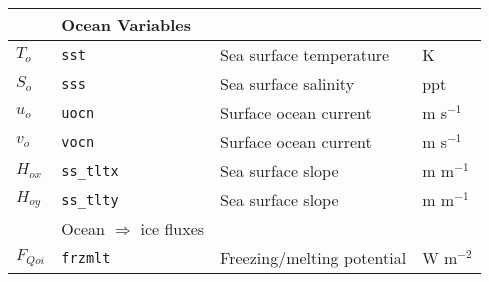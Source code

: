 \begin{table}
\begin{center}
\begin{tabular}{llll}
                        & Ocean Variables                                 &  \\  \hline
         $T_o$       & {\tt sst}      &  Sea surface temperature            &  K            \\
         $S_o$       & {\tt sss}      &  Sea surface salinity               &  ppt          \\
         $u_o$       & {\tt uocn}     &  Surface ocean current              &  m s$^{-1}$         \\
         $v_o$       & {\tt vocn}     &  Surface ocean current              &  m s$^{-1}$         \\
         $H_{ox}$    & {\tt ss\_tltx} &  Sea surface slope                  &  m m$^{-1}$         \\
         $H_{oy}$    & {\tt ss\_tlty} &  Sea surface slope                  &  m m$^{-1}$         \\ \hline
                        & Ocean $\Rightarrow$ ice fluxes             &  \\  \hline
         $F_{Qoi}$   & {\tt frzmlt}   &  Freezing/melting potential         &  W m$^{-2}$         \\ \hline
  \end{tabular}
  \end{center}
\end{table}


